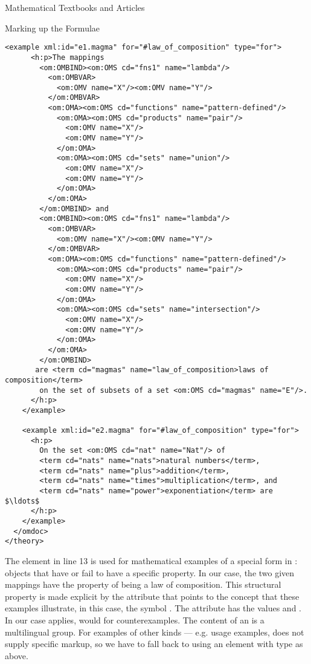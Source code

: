 \begin{omgroup}[short=Textbooks and Articles,id=algebra]{Mathematical Textbooks and Articles}
\begin{omgroup}[id=algebra.formulae]{Marking up the Formulae}
\begin{lstlisting}[label=lst:example-formulae,mathescape,
    caption={Examples for magmas with {\openmath} objects},
    index={example,h:p,OMBIND,OMS,OMA,OMV}]
    <example xml:id="e1.magma" for="#law_of_composition" type="for">
      <h:p>The mappings 
        <om:OMBIND><om:OMS cd="fns1" name="lambda"/>
          <om:OMBVAR>
            <om:OMV name="X"/><om:OMV name="Y"/>
          </om:OMBVAR>
          <om:OMA><om:OMS cd="functions" name="pattern-defined"/>
            <om:OMA><om:OMS cd="products" name="pair"/>
              <om:OMV name="X"/>
              <om:OMV name="Y"/>
            </om:OMA>
            <om:OMA><om:OMS cd="sets" name="union"/>
              <om:OMV name="X"/>
              <om:OMV name="Y"/>
            </om:OMA>
          </om:OMA>
        </om:OMBIND> and 
        <om:OMBIND><om:OMS cd="fns1" name="lambda"/>
          <om:OMBVAR>
            <om:OMV name="X"/><om:OMV name="Y"/>
          </om:OMBVAR>  
          <om:OMA><om:OMS cd="functions" name="pattern-defined"/>
            <om:OMA><om:OMS cd="products" name="pair"/>
              <om:OMV name="X"/>
              <om:OMV name="Y"/>
            </om:OMA>
            <om:OMA><om:OMS cd="sets" name="intersection"/>
              <om:OMV name="X"/>
              <om:OMV name="Y"/>
            </om:OMA>
          </om:OMA>
        </om:OMBIND>
       are <term cd="magmas" name="law_of_composition>laws of composition</term>
        on the set of subsets of a set <om:OMS cd="magmas" name="E"/>.
      </h:p>
    </example>
    
    <example xml:id="e2.magma" for="#law_of_composition" type="for">
      <h:p>
        On the set <om:OMS cd="nat" name="Nat"/> of 
        <term cd="nats" name="nats">natural numbers</term>, 
        <term cd="nats" name="plus">addition</term>, 
        <term cd="nats" name="times">multiplication</term>, and 
        <term cd="nats" name="power">exponentiation</term> are $\ldots$
      </h:p>
    </example>
  </omdoc>
</theory>
\end{lstlisting}

\noindent The {} element in line 13 is used for
mathematical examples of a special form in {\omdoc}: objects that
have or fail to have a specific property. In our case, the two given
mappings have the property of being a law of composition. This
structural property is made explicit by the
{} attribute that points to the concept that
these examples illustrate, in this case, the symbol
{}. The {}
attribute has the values {} and
{}.  In our case
{} applies,
{} would for counterexamples. The
content of an {} is a multilingual {}
group. For examples of other kinds --- e.g. usage examples, {\omdoc}
does not supply specific markup, so we have to fall back to using an
{} element with type
{} as above.


\end{omgroup}
\end{omgroup}
